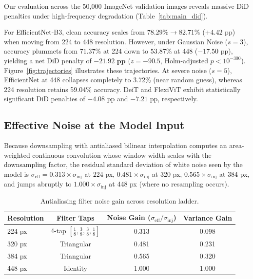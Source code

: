 \documentclass[10pt,twocolumn,letterpaper]{article}
\begin{document}
Our evaluation across the 50,000 ImageNet validation images reveals massive DiD penalties under high-frequency degradation (Table~\ref{tab:main_did}).

For EfficientNet-B3, clean accuracy scales from $78.29\% \to 82.71\%$ ($+4.42\text{ pp}$) when moving from 224 to 448 resolution. However, under Gaussian Noise ($s=3$), accuracy plummets from $71.37\%$ at 224 down to $53.87\%$ at 448 ($-17.50\text{ pp}$), yielding a net DiD penalty of $\mathbf{-21.92\text{ pp}}$ ($z = -90.5$, Holm-adjusted $p < 10^{-300}$). Figure~\ref{fig:trajectories} illustrates these trajectories. At severe noise ($s=5$), EfficientNet at 448 collapses completely to 3.72\% (near random guess), whereas 224 resolution retains 59.04\% accuracy. DeiT and FlexiViT exhibit statistically significant DiD penalties of $-4.08\text{ pp}$ and $-7.21\text{ pp}$, respectively.



\subsection{Effective Noise at the Model Input}

Because downsampling with antialiased bilinear interpolation computes an area-weighted continuous convolution whose window width scales with the downsampling factor, the residual standard deviation of white noise seen by the model is $\sigma_{\text{eff}} = 0.313 \times \sigma_{\text{inj}}$ at 224 px, $0.481 \times \sigma_{\text{inj}}$ at 320 px, $0.565 \times \sigma_{\text{inj}}$ at 384 px, and jumps abruptly to $1.000 \times \sigma_{\text{inj}}$ at 448 px (where no resampling occurs).

\begin{table}[h]
\centering
\small
\caption{Antialiasing filter noise gain across resolution ladder.}
\label{tab:noise_gain}
\begin{tabular}{lccc}
\toprule
Resolution & Filter Taps & Noise Gain ($\sigma_{\text{eff}} / \sigma_{\text{inj}}$) & Variance Gain \\
\midrule
224 px & 4-tap $[\frac{1}{8}, \frac{3}{8}, \frac{3}{8}, \frac{1}{8}]$ & 0.313 & 0.098 \\
320 px & Triangular & 0.481 & 0.231 \\
384 px & Triangular & 0.565 & 0.320 \\
448 px & Identity & 1.000 & 1.000 \\
\bottomrule
\end{tabular}
\end{table}
\end{document}
